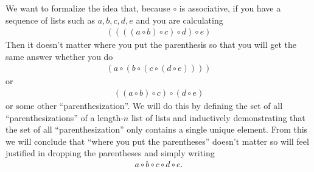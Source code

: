 \documentclass[12pt]{article}
\theoremstyle{break}
\theoremstyle{break}
\theoremstyle{break}
\theoremstyle{break}
\theoremstyle{break}
\newtheorem{informal definition}[definition]{Informal Definition}
\theoremstyle{break}
\newtheorem{informal theorem}[theorem]{Informal Theorem}
\begin{document}
	We want to formalize the idea that, because $\circ$ is associative, if you have a sequence of lists such as $a, b, c, d, e$ and you are calculating
	\begin{align*}
		((((a \circ b) \circ c) \circ d) \circ e)
	\end{align*}
	Then it doesn't matter where you put the parenthesis so that you will get the same answer whether you do 
	\begin{align*}
		(a \circ (b \circ (c \circ (d\circ e))))
	\end{align*}
	or 
	\begin{align*}
		((a\circ b) \circ c) \circ (d \circ e)
	\end{align*}
	or some other ``parenthesization''. 
	We will do this by defining the set of all ``parenthesizations'' of a length-$n$ list of lists and inductively demonstrating that the set of all ``parenthesization'' only contains a single unique element.
	From this we will conclude that ``where you put the parentheses'' doesn't matter so will feel justified in dropping the parentheses and simply writing
	\begin{align*}
		a \circ b \circ c \circ d \circ e.
	\end{align*}
	
\end{document}
